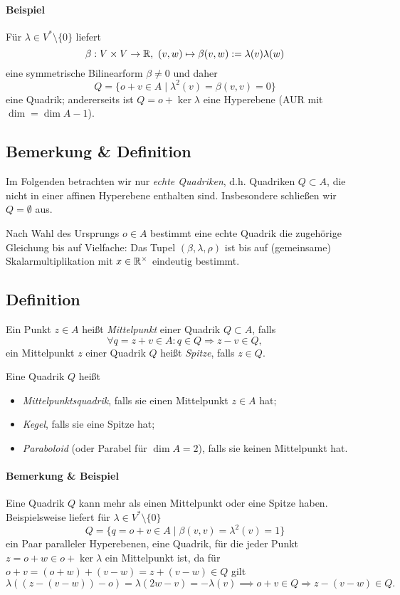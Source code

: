 \paragraph{Beispiel}
	Für $ \lambda\in V^*\setminus\{0\} $ liefert
		\[ \beta:V\times V\to \R,\ (v,w)\mapsto \beta(v,w):=\lambda(v)\lambda(w) \]
	eine symmetrische Bilinearform $ \beta\neq 0 $ und daher
		\[ Q=\{o+v\in A\mid \lambda^2(v)=\beta(v,v) = 0 \} \]
	eine Quadrik; andererseits ist $ Q = o+\ker \lambda $ eine Hyperebene (AUR mit $ \dim = \dim A-1 $).
\subsection{Bemerkung \& Definition}
\begin{Definition}
	Im Folgenden betrachten wir nur \emph{echte Quadriken}, d.h. Quadriken $ Q\subset A $, die nicht in einer affinen Hyperebene enthalten sind.
	Insbesondere schließen wir $ Q=\emptyset $ aus. 
\end{Definition}

	Nach Wahl des Ursprungs $ o\in A $ bestimmt eine echte Quadrik die zugehörige Gleichung bis auf Vielfache: Das Tupel $ (\beta,\lambda,\rho) $ ist bis auf (gemeinsame) Skalarmultiplikation mit $ x\in\mathbb{R}^\times  $ eindeutig bestimmt.
\subsection{Definition}
\begin{Definition}
	Ein Punkt $ z\in A $ heißt \emph{Mittelpunkt} einer Quadrik $ Q\subset A $, falls
		\[ \forall q=z+v\in A: q\in Q\Rightarrow z-v\in Q, \]
	ein Mittelpunkt $ z $ einer Quadrik $ Q $ heißt \emph{Spitze}, falls $ z\in Q $.
\end{Definition}	
\begin{Definition}

	Eine Quadrik $ Q $ heißt
	\begin{itemize}
		\item \emph{Mittelpunktsquadrik}, falls sie einen Mittelpunkt $ z\in A $ hat;
		\item \emph{Kegel}, falls sie eine Spitze hat; 
		\item \emph{Paraboloid} (oder Parabel für $ \dim A = 2 $), falls sie keinen Mittelpunkt hat.
	\end{itemize}
\end{Definition}	
\paragraph{Bemerkung \& Beispiel}
	Eine Quadrik $ Q $ kann mehr als einen Mittelpunkt oder eine Spitze haben.
	Beispielsweise liefert für $ \lambda\in V^*\setminus\{0\} $
		\[ Q = \{q=o+v\in A\mid \beta(v,v) = \lambda^2(v) = 1\} \]
	ein Paar paralleler Hyperebenen, eine Quadrik, für die jeder Punkt $ z = o+w \in o+\ker \lambda $ ein Mittelpunkt ist, da für $ o+v = (o+w)+(v-w) = z+(v-w)\in Q $ gilt
		\[ \lambda\left((z-(v-w))-o\right) = \lambda(2w-v) = -\lambda(v)\implies o+v\in Q\Rightarrow z-(v-w)\in Q. \]
